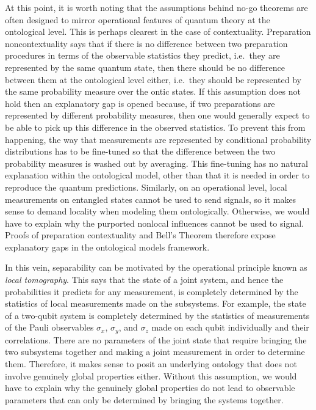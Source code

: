 \documentclass[DIV=calc,fontsize=12pt]{scrartcl} %
\theoremstyle{definition}
\theoremstyle{plain}
\begin{document}
At this point, it is worth noting that the assumptions behind no-go
theorems are often designed to mirror operational features of quantum
theory at the ontological level.  This is perhaps clearest in the case
of contextuality.  Preparation noncontextuality says that if there is
no difference between two preparation procedures in terms of the
observable statistics they predict, i.e.\ they are represented by the
same quantum state, then there should be no difference between them at
the ontological level either, i.e.\ they should be represented by the
same probability measure over the ontic states.  If this assumption
does not hold then an explanatory gap is opened because, if two
preparations are represented by different probability measures, then
one would generally expect to be able to pick up this difference in
the observed statistics.  To prevent this from happening, the way that
measurements are represented by conditional probability distributions
has to be fine-tuned so that the difference between the two
probability measures is washed out by averaging.  This fine-tuning has
no natural explanation within the ontological model, other than that
it is needed in order to reproduce the quantum predictions.
Similarly, on an operational level, local measurements on entangled
states cannot be used to send signals, so it makes sense to demand
locality when modeling them ontologically.  Otherwise, we would have
to explain why the purported nonlocal influences cannot be used to
signal.  Proofs of preparation contextuality and Bell's Theorem
therefore expose explanatory gaps in the ontological models framework.

In this vein, separability can be motivated by the operational
principle known as \emph{local tomography}.  This says that the state
of a joint system, and hence the probabilities it predicts for any
measurement, is completely determined by the statistics of local
measurements made on the subsystems.  For example, the state of a
two-qubit system is completely determined by the statistics of
measurements of the Pauli observables $\sigma_x$, $\sigma_y$, and
$\sigma_z$ made on each qubit individually and their correlations.
There are no parameters of the joint state that require bringing the
two subsystems together and making a joint measurement in order to
determine them.  Therefore, it makes sense to posit an underlying
ontology that does not involve genuinely global properties either.
Without this assumption, we would have to explain why the genuinely
global properties do not lead to observable parameters that can only
be determined by bringing the systems together.
\end{document}
